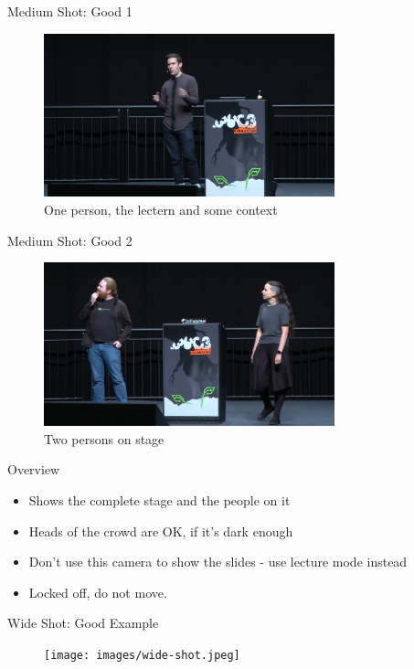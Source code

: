 \begin{frame}{Medium Shot: Good 1}
	\begin{figure}
		\centering
		\includegraphics[width=0.75\textwidth]{images/medium1.png}
		\caption{One person, the lectern and some context}
	\end{figure}
\end{frame}

\begin{frame}{Medium Shot: Good 2}
	\begin{figure}
		\centering
		\includegraphics[width=0.75\textwidth]{images/medium2.png}
		\caption{Two persons on stage}
	\end{figure}
\end{frame}

\begin{frame}{Overview}
	\begin{itemize}
		\item Shows the complete stage and the people on it
		\item Heads of the crowd are OK, if it's dark enough
		\item Don't use this camera to show the slides - use lecture mode instead
		\item Locked off, do not move.
	\end{itemize}
\end{frame}

\begin{frame}{Wide Shot: Good Example}
	\begin{figure}
		\centering
		\texttt{[image: images/wide-shot.jpeg]}
	\end{figure}
\end{frame}
